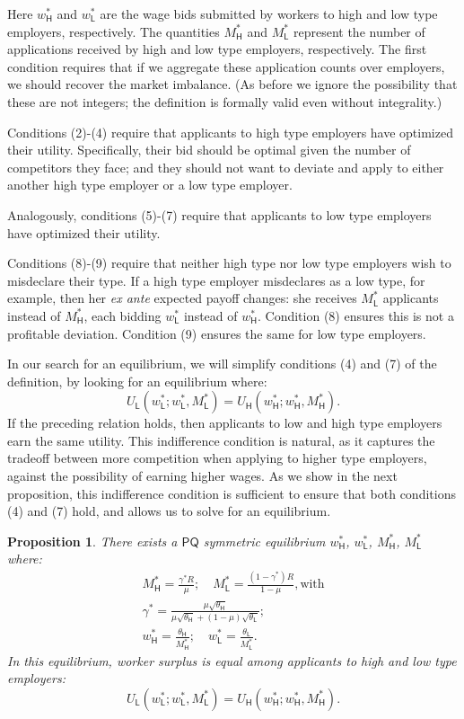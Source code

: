 \documentclass[11pt]{article}
\renewcommand{\H}{\ensuremath{\mathsf{H}}}
\renewcommand{\L}{\ensuremath{\mathsf{L}}}
\newcommand{\HT}{\ensuremath{\mathsf{PQ}}}
\newtheorem{prop}{Proposition}
\begin{document}
Here $w_\H^*$ and $w_\L^*$ are the wage bids submitted by workers to high and low type employers, respectively.
The quantities $M_\H^*$ and $M_\L^*$ represent the number of applications received by high and low type employers, respectively.
The first condition requires that if we aggregate these application counts over employers, we should recover the market imbalance.
(As before we ignore the possibility that these are not integers; the definition is formally valid even without integrality.)

Conditions (2)-(4) require that applicants to high type employers have optimized their utility.
Specifically, their bid should be optimal given the number of competitors they face;
and they should not want to deviate and apply to either another high type employer or a low type employer.

Analogously, conditions (5)-(7) require that applicants to low type employers have optimized their utility.

Conditions (8)-(9) require that neither high type nor low type employers wish to misdeclare their type.
If a high type employer misdeclares as a low type, for example, then her {\em ex ante} expected payoff changes:
she receives $M_\L^*$ applicants instead of $M_\H^*$, each bidding $w_\L^*$ instead of $w_\H^*$.
Condition (8) ensures this is not a profitable deviation.
Condition (9) ensures the same for low type employers.

In our search for an equilibrium, we will simplify conditions (4) and (7) of the definition, by looking for an equilibrium where:
\[ U_{\L}(w_\L^* ; w_\L^*, M_\L^*) = U_{\H}(w_\H^* ; w_\H^*, M_\H^*). \]
If the preceding relation holds, then applicants to low and high type employers earn the same utility.
This indifference condition is natural, as it captures the tradeoff between more competition when applying to higher type employers, against the possibility of earning higher wages.
As we show in the next proposition, this indifference condition is sufficient to ensure that both conditions (4) and (7) hold, and allows us to solve for an equilibrium.  

\begin{prop}
\label{prop:ht}
There exists a $\HT$ symmetric equilibrium $w_\H^*$, $w_\L^*$, $M_\H^*$, $M_\L^*$ where:
\begin{gather}
M_{\H}^* = \frac{\gamma^* R}{\mu};  \quad M_{\L}^* = \frac{(1-\gamma^*)R}{1 - \mu}, \text{with} \label{eq:ht_M_eq}\\
\gamma^* = \frac{\mu\sqrt{\theta_\H}}{\mu\sqrt{\theta_\H} + (1-\mu)\sqrt{\theta_\L}}; \label{eq:ht_gamma_eq}\\
w_\H^* = \frac{\theta_\H}{M_\H^*};\quad w_\L^* = \frac{\theta_\L}{M_\L^*}. \label{eq:ht_w_eq}
\end{gather}
In this equilibrium, worker surplus is equal among applicants to high and low type employers:
\begin{equation}
\label{eq:equal_util}
 U_{\L}(w_\L^* ; w_\L^*, M_\L^*) = U_{\H}(w_\H^* ; w_\H^*, M_\H^*).
\end{equation}
\end{prop}
\end{document}
